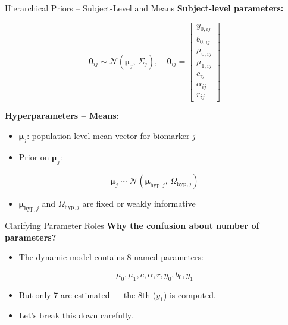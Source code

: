 \documentclass[
  ignorenonframetext,
]{beamer}
\providecommand{\tightlist}{%
  \setlength{\itemsep}{0pt}\setlength{\parskip}{0pt}}\usepackage{longtable,booktabs,array}
\begin{document}
\begin{frame}{Hierarchical Priors -- Subject-Level and Means}
\label{hierarchical-priors-subject-level-and-means}
\textbf{Subject-level parameters:}

\[
\boldsymbol{\theta}_{ij} 
\sim 
\mathcal{N}(\boldsymbol{\mu}_j,\,\Sigma_j),\quad
\boldsymbol{\theta}_{ij} = 
\begin{bmatrix}
y_{0,ij} \\
b_{0,ij} \\
\mu_{0,ij} \\
\mu_{1,ij} \\
c_{ij} \\
\alpha_{ij} \\
r_{ij}
\end{bmatrix}
\]

\textbf{Hyperparameters -- Means:}

\begin{itemize}
\tightlist
\item
  \(\boldsymbol{\mu}_j\): population-level mean vector for biomarker
  \(j\)\\
\item
  Prior on \(\boldsymbol{\mu}_j\):
\end{itemize}

\[
\boldsymbol{\mu}_j \sim \mathcal{N}(\boldsymbol{\mu}_{\mathrm{hyp},j},\,\Omega_{\mathrm{hyp},j})
\]

\begin{itemize}
\tightlist
\item
  \(\boldsymbol{\mu}_{\mathrm{hyp},j}\) and \(\Omega_{\mathrm{hyp},j}\)
  are fixed or weakly informative
\end{itemize}
\end{frame}

\begin{frame}{Clarifying Parameter Roles}
\label{clarifying-parameter-roles}
\textbf{Why the confusion about number of parameters?}

\begin{itemize}
\tightlist
\item
  The dynamic model contains 8 named parameters:
\end{itemize}

\[
\mu_0, \mu_1, c, \alpha, r, y_0, b_0, y_1
\]

\begin{itemize}
\tightlist
\item
  But only 7 are estimated --- the 8th (\(y_1\)) is computed.
\item
  Let's break this down carefully.
\end{itemize}
\end{frame}
\end{document}
